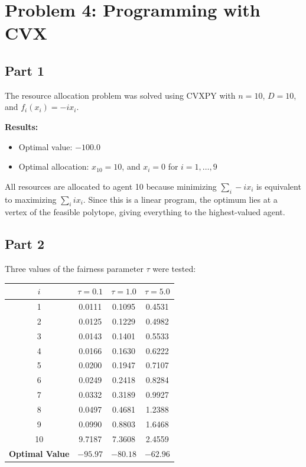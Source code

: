 \documentclass[12pt]{article}
\begin{document}
\newpage
\section*{Problem 4: Programming with CVX}

\subsection*{Part 1}

The resource allocation problem was solved using CVXPY with $n = 10$, $D = 10$, and $f_i(x_i) = -ix_i$.

\textbf{Results:}
\begin{itemize}
    \item Optimal value: $-100.0$
    \item Optimal allocation: $x_{10} = 10$, and $x_i = 0$ for $i = 1, \ldots, 9$
\end{itemize}

All resources are allocated to agent 10 because minimizing $\sum_{i} -ix_i$ is equivalent to maximizing $\sum_{i} ix_i$. Since this is a linear program, the optimum lies at a vertex of the feasible polytope, giving everything to the highest-valued agent.

\subsection*{Part 2}

Three values of the fairness parameter $\tau$ were tested:

\begin{table}[h]
\centering
\begin{tabular}{c|ccc}
\hline
$i$ & $\tau = 0.1$ & $\tau = 1.0$ & $\tau = 5.0$ \\
\hline
1  & 0.0111 & 0.1095 & 0.4531 \\
2  & 0.0125 & 0.1229 & 0.4982 \\
3  & 0.0143 & 0.1401 & 0.5533 \\
4  & 0.0166 & 0.1630 & 0.6222 \\
5  & 0.0200 & 0.1947 & 0.7107 \\
6  & 0.0249 & 0.2418 & 0.8284 \\
7  & 0.0332 & 0.3189 & 0.9927 \\
8  & 0.0497 & 0.4681 & 1.2388 \\
9  & 0.0990 & 0.8803 & 1.6468 \\
10 & 9.7187 & 7.3608 & 2.4559 \\
\hline
\textbf{Optimal Value} & $-95.97$ & $-80.18$ & $-62.96$ \\
\hline
\end{tabular}
\end{table}
\end{document}
